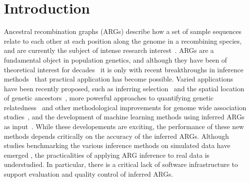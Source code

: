 \documentclass[unnumsec,webpdf,contemporary,large,namedate]{oup-authoring-template}%
\begin{document}
 \maketitle

\section{Introduction}
Ancestral recombination graphs (ARGs) describe how a set of sample
sequences relate to each other at each position along the genome in a
recombining
species, and are currently the subject of intense research
interest~\citep{brandt2024promise,lewanski2024era,nielsen2024inference,
    wong2024general}. ARGs are a fundamental object in population genetics,
and although they have been of theoretical interest for
decades~\citep{Hudson1983,Griffiths1997} it is only with recent breakthroughs
in inference methods~\citep{rasmussen2014genome,
    speidel2019method,kelleher2019inferring,wohns2022unified,zhang2023biobank,
    gunnarsson2024scalable,deng2024robust} that practical application has
become possible. Varied applications have been recently proposed,
such as inferring selection~\citep{stern2019approximate,hejase2022deep} and
the spatial location of genetic ancestors~\citep{osmond2024estimating,deraje2024inferring,grundler2024geographic},
more powerful approaches to quantifying genetic
relatedness~\citep{fan2022genealogical,zhang2023biobank,gunnarsson2024scalable,lehmann2025on}
and other methodological improvements for genome wide association
studies~\citep{nowbandegani2023extremely,link2023tree},
and the development of machine learning methods using inferred
ARGs as input~\citep{hejase2022deep,pearson2023local,korfmann2024simultaneous,
whitehouse2024tree}.
While these developements are exciting, the performance 
of these new methods depends critically on the accuracy of the inferred ARGs.
Although studies benchmarking the various inference methods on 
simulated data have emerged 
\citep{brandt2022evaluation,deng2024robust,peng2024evaluating},
the practicalities of applying ARG inference to real data is 
understudied. In particular, there is a critical lack of software 
infrastructure to support evaluation and quality control of 
inferred ARGs.
\end{document}
